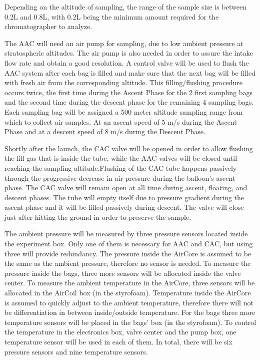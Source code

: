Depending on the altitude of sampling, the range of the sample size is between 0.2L and 0.8L, with 0.2L being the minimum amount required for the chromatographer to analyze. 

The AAC will need an air pump for sampling, due to low ambient pressure at stratospheric altitudes. The air pump is also needed in order to assure the intake flow rate and obtain a good resolution. A control valve will be used to flush the AAC system after each bag is filled and make sure that the next bag will be filled with fresh air from the corresponding altitude. This filling/flushing procedure occurs twice, the first time during the Ascent Phase for the 2 first sampling bags and the second time during the descent phase for the remaining 4 sampling bags. Each sampling bag will be assigned a 500 meter altitude sampling range from which to collect air samples. At an ascent speed of 5 m/s during the Ascent Phase and at a descent speed of 8 m/s during the Descent Phase. 

Shortly after the launch, the CAC valve will be opened in order to allow flushing the fill gas that is inside the tube, while the AAC valves will be closed until reaching the sampling altitude.Flushing of the CAC tube happens passively through the progressive decrease in air pressure during the balloon's ascent phase. The CAC valve will remain open at all time during ascent, floating, and descent phases. The tube will empty itself due to pressure gradient during the ascent phase and it will be filled passively during descent. The valve will close just after hitting the ground in order to preserve the sample. 

The ambient pressure will be measured by three pressure sensors located inside the experiment box. Only one of them is necessary for AAC and CAC, but using three will provide redundancy. The pressure inside the AirCore is assumed to be the same as the ambient pressure, therefore no sensor is needed. To measure the pressure inside the bags, three more sensors will be allocated inside the valve center. To measure the ambient temperature in the AirCore, three sensors will be allocated in the AirCoil box (in the styrofoam). Temperature inside the AirCore is assumed to quickly adjust to the ambient temperature, therefore there will not be differentiation in between inside/outside temperature. For the bags three more temperature sensors will be placed in the bags' box (in the styrofoam). To control the temperature in the electronics box, valve center and the pump box, one temperature sensor will be used in each of them. In total, there will be six pressure sensors and nine temperature sensors. 


